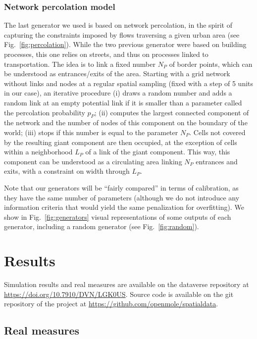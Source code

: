 \documentclass[letterpaper]{article}
\begin{document}
\subsubsection{Network percolation model}

The last generator we used is based on network percolation, in the spirit of capturing the constraints imposed by flows traversing a given urban area (see Fig.~\ref{fig:percolation}). While the two previous generator were based on building processes, this one relies on streets, and thus on processes linked to transportation. The idea is to link a fixed number $N_P$ of border points, which can be understood as entrances/exits of the area. Starting with a grid network without links and nodes at a regular spatial sampling (fixed with a step of 5 units in our case), an iterative procedure (i) draws a random number and adds a random link at an empty potential link if it is smaller than a parameter called the percolation probability $p_P$; (ii) computes the largest connected component of the network and the number of nodes of this component on the boundary of the world; (iii) stops if this number is equal to the parameter $N_P$. Cells not covered by the resulting giant component are then occupied, at the exception of cells within a neighborhood $L_P$ of a link of the giant component. This way, this component can be understood as a circulating area linking $N_P$ entrances and exits, with a constraint on width through $L_P$.


Note that our generators will be ``fairly compared'' in terms of calibration, as they have the same number of parameters (although we do not introduce any information criteria that would yield the same penalization for overfitting).
We show in Fig.~\ref{fig:generators} visual representations of some outputs of each generator, including a random generator (see Fig.~\ref{fig:random}).


\section{Results} \label{sec:results}

Simulation results and real measures are available on the dataverse repository at \url{https://doi.org/10.7910/DVN/LGK0US}. Source code is available on the git repository of the project at \url{https://github.com/openmole/spatialdata}.


\subsection{Real measures}
\end{document}
